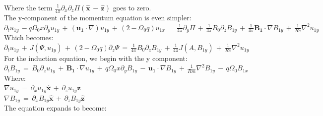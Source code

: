 \documentclass[letterpaper,12pt]{article}
\newcommand\reye{\mathrel{Re}}
\newcommand\reym{\mathrel{Rm}}
\begin{document}
Where the term $\frac{1}{4\pi}\partial_x\partial_z\Pi \left(\mathbf{\hat{x}} \, - \, \mathbf{\hat{z}}\right)$ goes to zero. \\

The y-component of the momentum equation is even simpler: \\

$\partial_t u_{1y} \, - q\Omega_0 x \partial_y u_{1y} \, + \, \left(\mathbf{u_1} \cdot \nabla \right)u_{1y} \, + \, \left(2 - \Omega_0 q\right) u_{1x} \, = \, \frac{1}{4\pi} \partial_y \Pi \, + \, \frac{1}{4\pi} B_0 \partial_z B_{1y} \, + \, \frac{1}{4\pi}\mathbf{B_1} \cdot \nabla B_{1y} \, + \, \frac{1}{\reye}\nabla^2 u_{1y}$ \\

Which becomes: \\

$\partial_t u_{1y} \, + \, J\left(\Psi, u_{1y}\right) \, + \, \left(2 - \Omega_0 q\right) \partial_z \Psi \, = \, \frac{1}{4\pi}B_0\partial_z B_{1y} \, + \, \frac{1}{4\pi} J\left(A, B_{1y}\right) \, + \, \frac{1}{\reye} \nabla^2 u_{1y}$ \\


For the induction equation, we begin with the y component: \\

$\partial_t B_{1y} \, = \, B_0 \partial_z u_{1y} \, + \, \mathbf{B_1} \cdot \nabla u_{1y} \, + \, q \Omega_0x\partial_y B_{1y} \, - \, \mathbf{u_1} \cdot \nabla B_{1y} \, + \, \frac{1}{\reym} \nabla^2 B_{1y} \, - \, q\Omega_0 B_{1x} \,$ \\

Where: \\

$\nabla u_{1y} \, = \, \partial_x u_{1y} \mathbf{\hat{x}} \, + \, \partial_z u_{1y}\mathbf{\hat{z}}$ \\

$\nabla B_{1y} \, = \, \partial_x B_{1y}\mathbf{\hat{x}} \, + \, \partial_z B_{1y}\mathbf{\hat{z}}$ \\

The equation expands to become: \\
\end{document}
